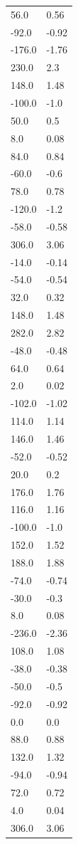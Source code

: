 \begin{longtable}{ll}
56.0 & 0.56 \\
-92.0 & -0.92 \\
-176.0 & -1.76 \\
230.0 & 2.3 \\
148.0 & 1.48 \\
-100.0 & -1.0 \\
50.0 & 0.5 \\
8.0 & 0.08 \\
84.0 & 0.84 \\
-60.0 & -0.6 \\
78.0 & 0.78 \\
-120.0 & -1.2 \\
-58.0 & -0.58 \\
306.0 & 3.06 \\
-14.0 & -0.14 \\
-54.0 & -0.54 \\
32.0 & 0.32 \\
148.0 & 1.48 \\
282.0 & 2.82 \\
-48.0 & -0.48 \\
64.0 & 0.64 \\
2.0 & 0.02 \\
-102.0 & -1.02 \\
114.0 & 1.14 \\
146.0 & 1.46 \\
-52.0 & -0.52 \\
20.0 & 0.2 \\
176.0 & 1.76 \\
116.0 & 1.16 \\
-100.0 & -1.0 \\
152.0 & 1.52 \\
188.0 & 1.88 \\
-74.0 & -0.74 \\
-30.0 & -0.3 \\
8.0 & 0.08 \\
-236.0 & -2.36 \\
108.0 & 1.08 \\
-38.0 & -0.38 \\
-50.0 & -0.5 \\
-92.0 & -0.92 \\
0.0 & 0.0 \\
88.0 & 0.88 \\
132.0 & 1.32 \\
-94.0 & -0.94 \\
72.0 & 0.72 \\
4.0 & 0.04 \\
306.0 & 3.06 \\

\end{longtable}
